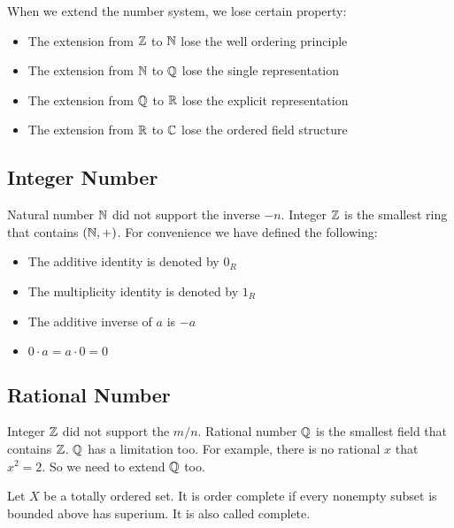 When we extend the number system, we lose certain property:
\begin{itemize}
    \item The extension from $\mathbb{Z}$ to $\mathbb{N}$ lose the well ordering principle
    \item The extension from $\mathbb{N}$ to $\mathbb{Q}$ lose the single representation
    \item The extension from $\mathbb{Q}$ to $\mathbb{R}$ lose the explicit representation
    \item The extension from $\mathbb{R}$ to $\mathbb{C}$ lose the ordered field structure
\end{itemize}

\subsection{Integer Number}
Natural number $\mathbb{N}$ did not support the inverse $-n$. Integer $\mathbb{Z}$ is the smallest ring that contains $(\mathbb{N}, +)$. For convenience we have defined the following:
\begin{itemize}
    \item The additive identity is denoted by $0_R$
    \item The multiplicity identity is denoted by $1_R$
    \item The additive inverse of $a$ is $-a$
    \item $0 \cdot a = a \cdot 0 = 0$
\end{itemize}

\subsection{Rational Number}
Integer $\mathbb{Z}$ did not support the $m/n$. Rational number $\mathbb{Q}$ is the smallest field that contains $\mathbb{Z}$. $\mathbb{Q}$ has a limitation too. For example, there is no rational $x$ that $x^2 = 2$. So we need to extend $\mathbb{Q}$ too.

\begin{definition}
    Let $X$ be a totally ordered set. It is order complete if every nonempty subset is bounded above has superium. It is also called complete.
\end{definition}


